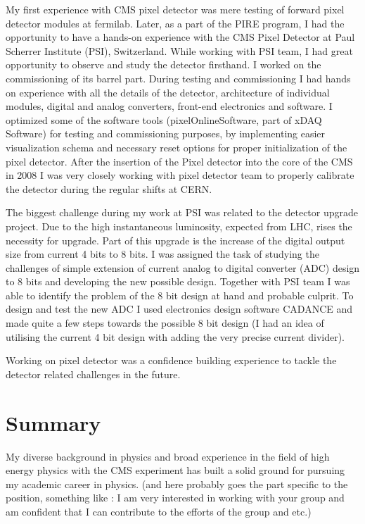\documentclass[a4paper]{article}
\begin{document}
My first experience with CMS pixel detector was mere testing of forward pixel detector modules at fermilab. Later, as a part of the PIRE program, I had the opportunity to have a hands-on experience with the CMS Pixel Detector at Paul Scherrer Institute (PSI), Switzerland. While working with PSI team, I had great opportunity to observe and study the detector firsthand. I worked on the commissioning of its barrel part. During testing and commissioning I had hands on experience with all the details of the detector, architecture of individual modules, digital and analog converters, front-end electronics and software. I optimized some of the software tools (pixelOnlineSoftware, part of xDAQ Software) for testing and commissioning purposes, by implementing easier visualization schema and necessary reset options for proper initialization of the pixel detector.  After the insertion of the Pixel detector into the core of the CMS in 2008 I was very closely working with pixel detector team to properly calibrate the detector during the regular shifts at CERN.

The biggest challenge during my work at PSI was related to the detector upgrade project. Due to the high instantaneous luminosity, expected from LHC, rises the necessity for upgrade. Part of this upgrade is the increase of the digital output size from current 4 bits to 8 bits. I was assigned the task of studying the challenges of simple extension of current analog to digital converter (ADC) design to 8 bits and developing the new possible design. Together with PSI team I was able to identify the problem of the 8 bit design at hand and probable culprit. To design and test the new ADC I used electronics design software CADANCE and made quite a few steps towards the possible 8 bit design (I had an idea of utilising the current 4 bit design with adding the very precise current divider).

Working on pixel detector was a confidence building experience to tackle the detector related challenges in the future.

\section{Summary}

My diverse background in physics and broad experience in the field of high energy physics with the CMS experiment has built a solid ground for pursuing my academic career in physics. (and here probably goes the part specific to the position, something like : I am very interested in working with your group and am confident that I can contribute to the efforts of the group and etc.)
\end{document}
